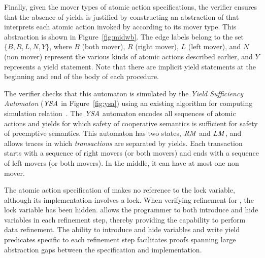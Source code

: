 Finally, given the mover types of atomic action specifications, the \civl verifier ensures
that the absence of yields is justified by constructing an abstraction of  
that interprets each atomic action invoked by  according to its mover type.
This abstraction is shown in Figure~\ref{fig:midwb}.
The edge labels belong to the set $\{B,R,L,N,Y\}$, where $B$ (both mover), $R$ (right mover), $L$ (left mover), and $N$ (non mover) 
represent the various kinds of atomic actions described earlier, and $Y$ represents a yield statement.
Note that there are implicit yield statements at the beginning and end of the body of each procedure.

The \civl verifier checks that this automaton is simulated by the {\em Yield Sufficiency Automaton\/} ($\mathit{YSA}$ in Figure~\ref{fig:ysa})
using an existing algorithm for computing simulation relation~\cite{HenzingerHK95}.
The $\mathit{YSA}$ automaton encodes all sequences of atomic actions and yields for which safety of cooperative semantics is sufficient 
for safety of preemptive semantics.
This automaton has two states, $\mathit{RM}$ and $\mathit{LM}$,
and allows traces in which {\em transactions\/} are separated by yields.
Each transaction starts with a sequence of right movers (or both movers) and ends with a sequence of left movers (or both movers).
In the middle, it can have at most one non mover.

The atomic action specification of  makes no reference to the lock variable, 
although its implementation involves a lock. 
When verifying refinement for , the lock variable has been hidden. 
\civl allows the programmer to both introduce and hide variables in each refinement step,
thereby providing the capability to perform data refinement.
The ability to introduce and hide variables and write yield predicates specific to each refinement step 
facilitates proofs spanning large abstraction gaps between the specification and implementation.
